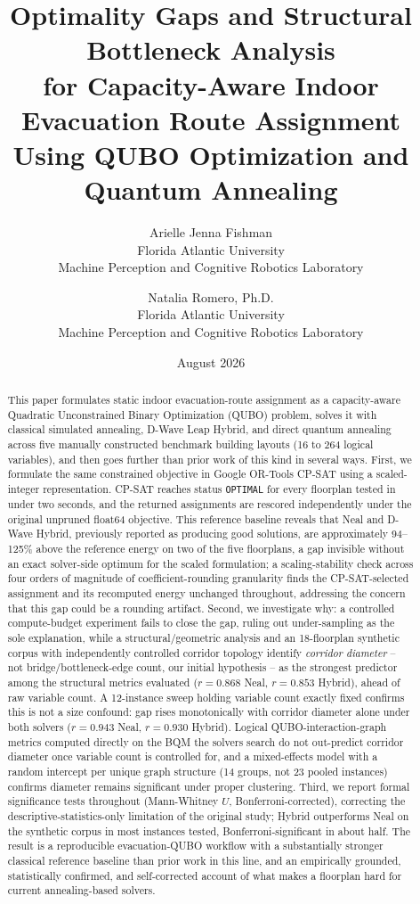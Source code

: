 \documentclass[11pt]{article}
\title{\textbf{Optimality Gaps and Structural Bottleneck Analysis \\
for Capacity-Aware Indoor Evacuation Route Assignment \\
Using QUBO Optimization and Quantum Annealing}}
\author{
Arielle Jenna Fishman \\
\small Florida Atlantic University \\
\small Machine Perception and Cognitive Robotics Laboratory
\and
Natalia Romero, Ph.D. \\
\small Florida Atlantic University \\
\small Machine Perception and Cognitive Robotics Laboratory
}
\date{August 2026}
\begin{document}
\maketitle

\begin{abstract}
This paper formulates static indoor evacuation-route assignment as a capacity-aware Quadratic Unconstrained Binary Optimization (QUBO) problem, solves it with classical simulated annealing, D-Wave Leap Hybrid, and direct quantum annealing across five manually constructed benchmark building layouts (16 to 264 logical variables), and then goes further than prior work of this kind in several ways. First, we formulate the same constrained objective in Google OR-Tools CP-SAT using a scaled-integer representation. CP-SAT reaches status \texttt{OPTIMAL} for every floorplan tested in under two seconds, and the returned assignments are rescored independently under the original unpruned float64 objective. This reference baseline reveals that Neal and D-Wave Hybrid, previously reported as producing good solutions, are approximately 94--125\% above the reference energy on two of the five floorplans, a gap invisible without an exact solver-side optimum for the scaled formulation; a scaling-stability check across four orders of magnitude of coefficient-rounding granularity finds the CP-SAT-selected assignment and its recomputed energy unchanged throughout, addressing the concern that this gap could be a rounding artifact. Second, we investigate why: a controlled compute-budget experiment fails to close the gap, ruling out under-sampling as the sole explanation, while a structural/geometric analysis and an 18-floorplan synthetic corpus with independently controlled corridor topology identify \emph{corridor diameter} -- not bridge/bottleneck-edge count, our initial hypothesis -- as the strongest predictor among the structural metrics evaluated ($r=0.868$ Neal, $r=0.853$ Hybrid), ahead of raw variable count. A 12-instance sweep holding variable count exactly fixed confirms this is not a size confound: gap rises monotonically with corridor diameter alone under both solvers ($r=0.943$ Neal, $r=0.930$ Hybrid). Logical QUBO-interaction-graph metrics computed directly on the BQM the solvers search do not out-predict corridor diameter once variable count is controlled for, and a mixed-effects model with a random intercept per unique graph structure (14 groups, not 23 pooled instances) confirms diameter remains significant under proper clustering. Third, we report formal significance tests throughout (Mann-Whitney $U$, Bonferroni-corrected), correcting the descriptive-statistics-only limitation of the original study; Hybrid outperforms Neal on the synthetic corpus in most instances tested, Bonferroni-significant in about half. The result is a reproducible evacuation-QUBO workflow with a substantially stronger classical reference baseline than prior work in this line, and an empirically grounded, statistically confirmed, and self-corrected account of what makes a floorplan hard for current annealing-based solvers.
\end{abstract}
\end{document}
